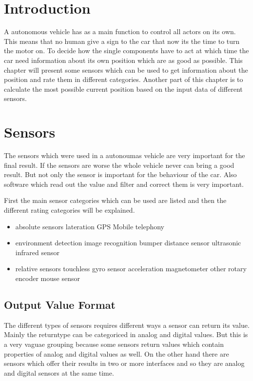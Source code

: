 \section{Introduction}\label{sec:positioningIntroduction}
A autonomous vehicle has as a main function to control all actors on its own.
This means that no human give a sign to the car that now its the time to turn the motor on.
To decide how the single components have to act at which time 
the car need information about its own position which are as good as possible.
This chapter will present some sensors which can be used to get information about the position and rate them in different categories.
Another part of this chapter is to calculate the most possible current position based on the input data of different sensors.


\section{Sensors}
The sensors which were used in a autonoumas vehicle are very important for the final result.
If the sensors are worse the whole vehicle never can bring a good result.
But not only the sensor is important for the behaviour of the car.
Also software which read out the value and filter and correct them is very important.

First the main sensor categories which can be used are listed and then the different rating categories will be explained.
\begin{itemize}
\item absolute sensors
	\subitem lateration
		\subsubitem GPS	
		\subsubitem Mobile telephony
\item environment detection
	\subitem image recognition
	\subitem bumper
	\subitem distance sensor
		\subsubitem ultrasonic
		\subsubitem infrared sensor
\item relative sensors
	\subitem touchless
		\subsubitem gyro sensor
		\subsubitem acceleration
		\subsubitem magnetometer
	\subitem other
		\subsubitem rotary encoder
		\subsubitem mouse sensor
\end{itemize}


\subsection{Output Value Format}
The different types of sensors requires different ways a sensor can return its value.
Mainly the returntype can be categoriced in analog and digital values.
But this is a very vaguae grouping because some sensors return values which contain properties of analog and digital values as well.
On the other hand there are sensors which offer their results in two or more interfaces and so they are analog and digital sensors at the same time.



